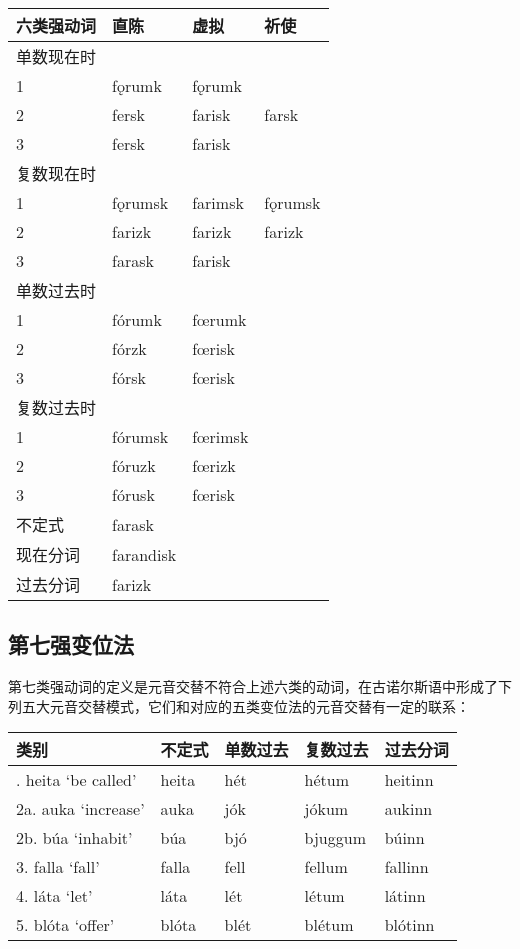 \begin{longtable}{llll}
  \toprule
  六类强动词 & 直陈      & 虚拟    & 祈使    \\
  \midrule
  \endhead
  \bottomrule
  \endfoot
  单数现在时 &           &         &         \\
  1          & fǫrumk    & fǫrumk  &         \\
  2          & fersk     & farisk  & farsk   \\
  3          & fersk     & farisk  &         \\
  复数现在时 &           &         &         \\
  1          & fǫrumsk   & farimsk & fǫrumsk \\
  2          & farizk    & farizk  & farizk  \\
  3          & farask    & farisk  &         \\
  单数过去时 &           &         &         \\
  1          & fórumk    & fœrumk  &         \\
  2          & fórzk     & fœrisk  &         \\
  3          & fórsk     & fœrisk  &         \\
  复数过去时 &           &         &         \\
  1          & fórumsk   & fœrimsk &         \\
  2          & fóruzk    & fœrizk  &         \\
  3          & fórusk    & fœrisk  &         \\
  不定式     & farask    &         &         \\
  现在分词   & farandisk &         &         \\
  过去分词   & farizk    &         &         \\
\end{longtable}

\subsection{第七强变位法}\label{第七强变位法}

第七类强动词的定义是元音交替不符合上述六类的动词，在古诺尔斯语中形成了下列五大元音交替模式，它们和对应的五类变位法的元音交替有一定的联系：

\begin{longtable}{lllll}
  \toprule
  类别                 & 不定式 & 单数过去 & 复数过去 & 过去分词 \\
  \midrule
  \endhead
  \bottomrule
  \endfoot
  1. heita `be called‌' & heita  & hét      & hétum    & heitinn  \\
  2a. auka `increase‌'  & auka   & jók      & jókum    & aukinn   \\
  2b. búa `inhabit‌'    & búa    & bjó      & bjuggum  & búinn    \\
  3. falla `fall‌'      & falla  & fell     & fellum   & fallinn  \\
  4. láta `let‌'        & láta   & lét      & létum    & látinn   \\
  5. blóta `offer‌'     & blóta  & blét     & blétum   & blótinn  \\
\end{longtable}

